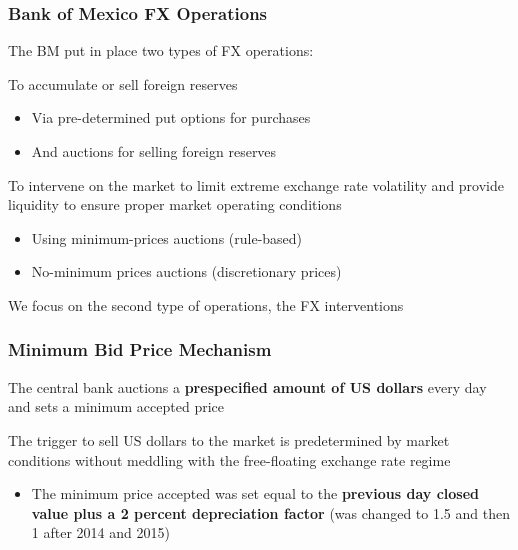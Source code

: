 \documentclass{beamer}
\newenvironment{largeitemize}{\itemize\addtolength{\itemsep}{10pt}}{\enditemize}
\newenvironment{wideenumerate}{\enumerate\addtolength{\itemsep}{30pt}}{\endenumerate}
\begin{document}
\begin{frame}
  \frametitle{Bank of Mexico FX Operations}
  The BM put in place two types of FX operations:\\
  \medskip
  
  \begin{wideenumerate}
  \item To accumulate or sell foreign reserves
    \begin{itemize}
    \item Via pre-determined put options for purchases
     \item And auctions for selling foreign reserves
    \end{itemize}
  \item To intervene on the market to limit extreme exchange rate volatility
    and provide liquidity to ensure proper market operating conditions
    \begin{itemize}
    \item Using minimum-prices auctions (rule-based)
    \item No-minimum prices auctions (discretionary prices)
    \end{itemize}
  \end{wideenumerate}

    \medskip
  We focus on the second type of operations, the FX interventions   
\end{frame}


\begin{frame}
  \frametitle{Minimum Bid Price Mechanism}
  \begin{largeitemize}
  \item The central bank auctions a \textbf{prespecified amount of US dollars} every
    day and sets a minimum accepted price
  \item The trigger to sell US dollars to the market is
    predetermined by market conditions without meddling with the free-floating
    exchange rate regime
    \begin{itemize}
    \item The minimum price accepted was set equal to the \textbf{previous day closed value plus a 2 percent
      depreciation factor} (was changed to 1.5 and then 1 after 2014 and 2015)
    \end{itemize}
  \end{largeitemize}  
\end{frame}
\end{document}
